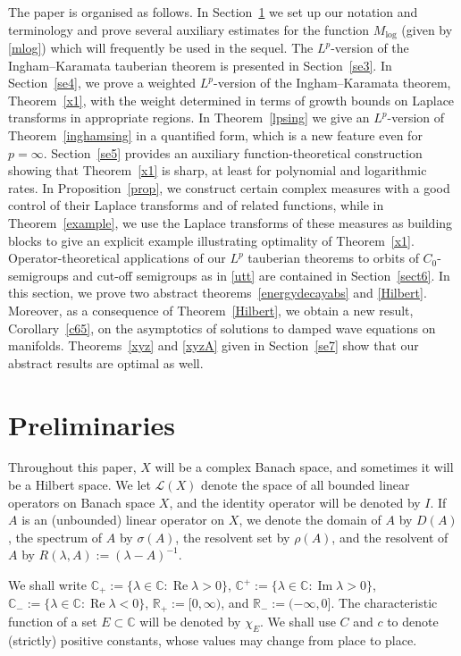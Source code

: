 \documentclass[11pt]{amsart}
\theoremstyle{definition}
\theoremstyle{remark}
\numberwithin{equation}{section}
\begin{document}
The paper is organised as follows. In Section~\ref{se2} we set up our notation and terminology and prove several auxiliary estimates for the function $M_{\log}$ (given by \eqref{mlog}) which will  frequently be used in the sequel.
The $L^p$-version of the Ingham--Karamata tauberian theorem is presented in Section~\ref{se3}. In Section~\ref{se4}, we prove a weighted $L^p$-version of the Ingham--Karamata theorem, Theorem~\ref{x1}, with the weight determined in terms of growth bounds on Laplace transforms in appropriate regions.
In Theorem~\ref{lpsing} we give an $L^p$-version of Theorem~\ref{inghamsing} in a quantified form, which is a new feature even for $p = \infty$.
Section~\ref{se5} provides an auxiliary function-theoretical construction showing that Theorem~\ref{x1} is sharp, at least for polynomial and logarithmic rates.
In Proposition~\ref{prop}, we construct certain complex measures with a good control of their Laplace transforms and of related functions, while in Theorem~\ref{example}, we use the Laplace transforms of these measures as building blocks to give an explicit example illustrating optimality of Theorem~\ref{x1}.
Operator-theoretical applications of our $L^p$ tauberian theorems to orbits of $C_0$-semigroups and cut-off semigroups as in \eqref{utt} are contained in Section~\ref{sect6}.
In this section, we prove two abstract theorems~\ref{energydecayabs} and \ref{Hilbert}.
Moreover, as a consequence of Theorem~\ref{Hilbert},  we obtain a new result, Corollary~\ref{c65}, on the asymptotics of solutions to damped wave equations on manifolds.
Theorems~\ref{xyz} and \ref{xyzA} given in Section~\ref{se7} show that our abstract results are optimal as well.

\section{Preliminaries}\label{se2}

Throughout this paper, $X$ will be a complex Banach space, and sometimes it will be a Hilbert space. We let ${\mathcal L}(X)$
denote the space of all bounded linear operators on Banach space $X$, and
the identity operator will be denoted by $I$. If $A$ is an (unbounded) linear
operator on $X$, we denote the domain of $A$ by $D(A)$,  the spectrum of $A$ by $\sigma(A)$, the resolvent set by $\rho(A)$,
and the resolvent of $A$ by $R(\lambda, A) := (\lambda-A)^{-1}$.

We shall  write
$\mathbb C_+ :=  \{\lambda \in \mathbb C : \operatorname{Re} \lambda  > 0\}$, $\mathbb C^+:=\{\lambda \in \mathbb C: \operatorname{ Im} \lambda >0\}$, ${{\mathbb C}}_- :=  \{\lambda \in \mathbb C : \operatorname{Re} \lambda  < 0\}$,
$\mathbb R_+ := [0,\infty)$, and $\mathbb R_- := (-\infty,0]$. The characteristic function of a set $E \subset \mathbb C$ will be denoted by $\chi_E$.  We shall use $C$ and $c$ to denote (strictly) positive constants, whose values may change from place to place.
\end{document}
